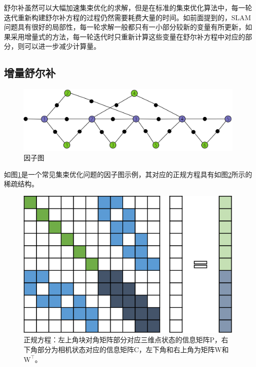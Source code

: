 舒尔补虽然可以大幅加速集束优化的求解，但是在标准的集束优化算法中，每一轮迭代重新构建舒尔补方程的过程仍然需要耗费大量的时间。如前面提到的，SLAM问题具有很好的局部性，每一轮求解一般都只有一小部分较新的变量有所更新，如果采用增量式的方法，每一轮迭代时只重新计算这些变量在舒尔补方程中对应的部分，则可以进一步减少计算量。

\subsection{增量舒尔补}

\begin{figure}[htb]
    \centering
    \includegraphics[width=.8\textwidth]{figs/factor_graph.png}
    \caption{因子图}
    \label{fig:factor_graph}
\end{figure}

如图\ref{fig:factor_graph}是一个常见集束优化问题的因子图示例，其对应的正规方程具有如图\ref{fig:normal_eq}所示的稀疏结构。

\begin{figure}[htb]
    \centering
    \includegraphics{figs/normal_eq.png}
    \caption{正规方程：左上角块对角矩阵部分对应三维点状态的信息矩阵$\mathrm{P}$，右下角部分为相机状态对应的信息矩阵$\mathrm{C}$，左下角和右上角为矩阵$\mathrm{W}$和$\mathrm{W}^\top$。}
    \label{fig:normal_eq}
\end{figure}

